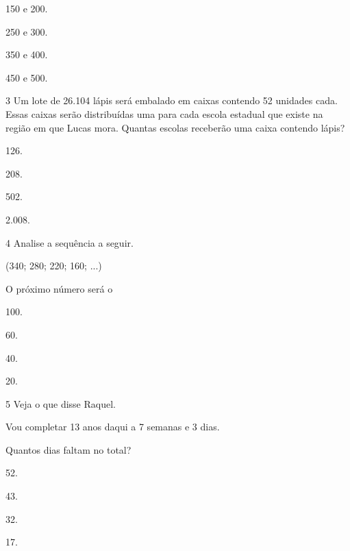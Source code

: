 \begin{escolha}
\item
  150 e 200.
\item
  250 e 300.
\item
  350 e 400.
\item
  450 e 500.
\end{escolha}

\num{3} Um lote de 26.104 lápis será embalado em caixas contendo 52 unidades cada. Essas caixas serão distribuídas uma para cada escola
estadual que existe na região em que Lucas mora. Quantas escolas
receberão uma caixa contendo lápis?

\begin{multicols}{2}
\begin{escolha}
\item
  126.
\item
  208.
\item
  502.
\item
  2.008.
\end{escolha}
\end{multicols}

\num{4} Analise a sequência a seguir.

\begin{mdframed}[linewidth=2pt,linecolor=azul!20,backgroundcolor=azul!20,roundcorner=2pt]
(340; 280; 220; 160; ...)
\end{mdframed}

 O próximo número será o

\begin{multicols}{2}
\begin{escolha}
\item
  100.
\item
  60.
\item
  40.
\item
  20.
\end{escolha}
\end{multicols}

\num{5} Veja o que disse Raquel.

\begin{mdframed}[linewidth=2pt,linecolor=azul!20,backgroundcolor=azul!20,roundcorner=2pt]
Vou completar 13 anos daqui a 7 semanas e 3 dias.
\end{mdframed}

Quantos dias faltam no total?

\begin{multicols}{2}
\begin{escolha}
\item
  52.
\item
  43.
\item
  32.
\item
  17.
\end{escolha}
\end{multicols}


